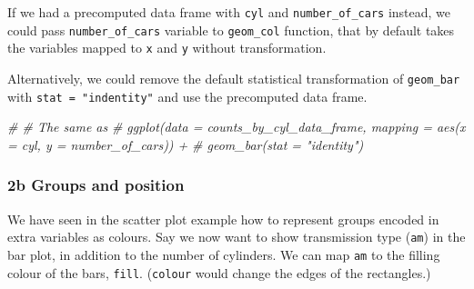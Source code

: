 \documentclass[
]{article}
\newenvironment{Shaded}{\begin{snugshade}}{\end{snugshade}}
\newcommand{\CommentTok}[1]{\textcolor[rgb]{0.56,0.35,0.01}{\textit{#1}}}
\newcommand{\FunctionTok}[1]{\textcolor[rgb]{0.13,0.29,0.53}{\textbf{#1}}}
\newcommand{\NormalTok}[1]{#1}
\newcommand{\OtherTok}[1]{\textcolor[rgb]{0.56,0.35,0.01}{#1}}
\newcommand{\SpecialCharTok}[1]{\textcolor[rgb]{0.81,0.36,0.00}{\textbf{#1}}}
\newcommand{\StringTok}[1]{\textcolor[rgb]{0.31,0.60,0.02}{#1}}
\begin{document}
If we had a precomputed data frame with \texttt{cyl} and
\texttt{number\_of\_cars} instead, we could pass
\texttt{number\_of\_cars} variable to \texttt{geom\_col} function, that
by default takes the variables mapped to \texttt{x} and \texttt{y}
without transformation.

\begin{Shaded}
\end{Shaded}

Alternatively, we could remove the default statistical transformation of
\texttt{geom\_bar} with \texttt{stat\ =\ "indentity"} and use the
precomputed data frame.

\begin{Shaded}
\begin{Highlighting}[]
\CommentTok{\# \# The same as}
\CommentTok{\# ggplot(data = counts\_by\_cyl\_data\_frame, mapping = aes(x = cyl, y = number\_of\_cars)) +}
\CommentTok{\#   geom\_bar(stat = "identity")}
\end{Highlighting}
\end{Shaded}

\subsubsection{\texorpdfstring{\textbf{2b} \textbar{} Groups and
position}{2b \textbar{} Groups and position}}\label{b-groups-and-position}

We have seen in the scatter plot example how to represent groups encoded
in extra variables as colours. Say we now want to show transmission type
(\texttt{am}) in the bar plot, in addition to the number of cylinders.
We can map \texttt{am} to the filling colour of the bars, \texttt{fill}.
(\texttt{colour} would change the edges of the rectangles.)
\end{document}
